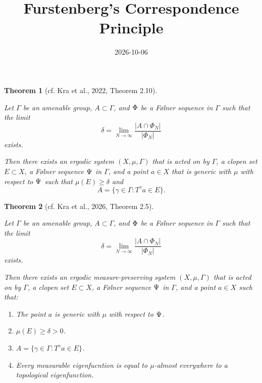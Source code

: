 \documentclass[
  british,
]{article}
\title{Furstenberg's Correspondence Principle}
\author{}
\date{2026-10-06}
\providecommand{\tightlist}{%
  \setlength{\itemsep}{0pt}\setlength{\parskip}{0pt}}
\theoremstyle{plain}
\newtheorem{theorem}{Theorem}[section]
\theoremstyle{remark}
\newcommand{\AmenableGroup}{{\Gamma}}
\newcommand{\AmenableGroupElement}{{\gamma}}
\newcommand{\CountingMeasure}[1]{{\left|#1\right|}}
\newcommand{\Folner}[1][\vphantom{}]{{\Phi}_{#1}}
\newcommand{\FurstenbergFolner}[1][{\vphantom{}}]{{\Psi}_{#1}}
\newcommand{\GroupAction}[2]{T^{#1}{#2}}
\newcommand{\Measure}{{\mu}}
\newcommand{\ShiftSpace}{{X}}
\begin{document}
\maketitle


\begin{theorem}[{cf. Kra et al., 2022, Theorem
2.10}]\protect\hypertarget{thm-FCP}{}\label{thm-FCP}

Let \(\AmenableGroup\) be an amenable group,
\(A\subset \AmenableGroup\), and \(\Folner\) be a Følner sequence in
\(\AmenableGroup\) such that the limit
\[\delta=\lim_{N\rightarrow\infty}\frac{\CountingMeasure{A\cap\Folner[N]}}{\CountingMeasure{\Folner[N]}}\]
exists.

Then there exists an ergodic system
\((\ShiftSpace,\Measure,\AmenableGroup)\) that is acted on by
\(\AmenableGroup\), a clopen set \(E\subset\ShiftSpace\), a Følner
sequence \(\FurstenbergFolner\) in \(\AmenableGroup\), and a point
\(a\in\ShiftSpace\) that is generic with \(\Measure\) with respect to
\(\FurstenbergFolner\) such that \(\Measure(E)\geq\delta\) and
\[A=\{\AmenableGroupElement\in \AmenableGroup:\GroupAction{\AmenableGroupElement}{a}\in E\}. \]

\end{theorem}

\begin{theorem}[{cf. Kra et al., 2026, Theorem
2.5}]\protect\hypertarget{thm-FCP2}{}\label{thm-FCP2}

Let \(\AmenableGroup\) be an amenable group,
\(A\subset \AmenableGroup\), and \(\Folner\) be a Følner sequence in
\(\AmenableGroup\) such that the limit
\[\delta=\lim_{N\rightarrow\infty}\frac{\CountingMeasure{A\cap\Folner[N]}}{\CountingMeasure{\Folner[N]}}\]
exists.

Then there exists an ergodic measure-preserving system
\((\ShiftSpace,\Measure,\AmenableGroup)\) that is acted on by
\(\AmenableGroup\), a clopen set \(E\subset\ShiftSpace\), a Følner
sequence \(\FurstenbergFolner\) in \(\AmenableGroup\), and a point
\(a\in\ShiftSpace\) such that:

\begin{enumerate}
\def\labelenumi{\arabic{enumi}.}
\tightlist
\item
  The point \(a\) is generic with \(\Measure\) with respect to
  \(\FurstenbergFolner\).
\item
  \(\Measure(E)\geq\delta>0\).
\item
  \(A=\{\AmenableGroupElement\in \AmenableGroup:\GroupAction{\AmenableGroupElement}{a}\in E\}\).
\item
  Every measurable eigenfucntion is equal to \(\mu\)-almost everywhere
  to a topological eigenfunction.
\end{enumerate}

\end{theorem}
\end{document}
